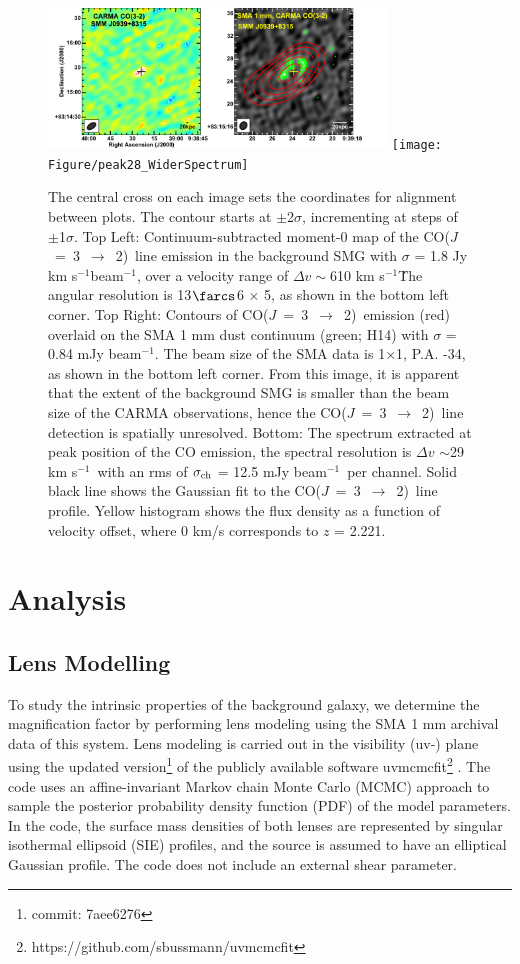 \documentclass[twocolumn,apj,numberedappendix]{emulateapj}
\newcommand{\CO}{\mbox{CO($J$ = 3 $\rightarrow$ 2) }}
\newcommand{\pmOne}{$^{-1}$}
\begin{document}
\begin{figure}[tbph] 
\centering
\includegraphics[width=0.8\textwidth]{Figure/LinePanel}
\texttt{[image: Figure/peak28\_WiderSpectrum]}
\caption{The central cross on each image sets the coordinates for alignment between plots. The contour starts at $\pm$2$\sigma$, 
incrementing at
steps of $\pm$1$\sigma$. Top Left: Continuum-subtracted moment-0 map of the \CO line emission in 
the background SMG with $\sigma$ = 1.8 Jy km s\pmOne beam\pmOne, over a velocity range of $\Delta v\sim$610 km s\pmOne\. The angular resolution is 13$\farcs$6 $\times$ 
5, as shown in the bottom left corner. 
Top Right: Contours of \CO emission (red) overlaid on the SMA 1 mm dust continuum (green; H14) with $
\sigma$ = 0.84 mJy beam\pmOne. The beam size of the SMA data is 1$ \times $1, P.A. -34\degr, as shown 
in the bottom left corner. From this image, it is apparent that the extent of the background SMG is smaller than the beam 
size of the CARMA observations, hence the \CO line detection is spatially unresolved. Bottom: 
The spectrum extracted at peak position of the CO emission, the spectral resolution is $\Delta v$ $\sim$29 km s\pmOne\ with an rms of $\sigma_{\rm ch}$ = 12.5 mJy beam\pmOne\ per channel.
Solid black line shows the Gaussian fit to the \CO line profile. Yellow histogram shows the 
flux density as a function of velocity offset, where 0 km/s corresponds to $z$ = 2.221. \label{fig:mom0}}
\end{figure}


\section{Analysis}
\subsection{Lens Modelling} \label{sec:Lens} 
To study the intrinsic properties of the background galaxy, we determine the magnification factor by performing
lens modeling using the SMA 1 mm archival data of this system. Lens modeling is carried out in the visibility
(uv-) plane using the updated version\footnote{commit: 7aee6276} of the publicly available software {\sc uvmcmcfit}\footnote{https://github.com/sbussmann/uvmcmcfit}
\citep{Bussmann15a}. The code uses an affine-invariant Markov chain Monte Carlo (MCMC) approach to sample the posterior
probability density function (PDF) of the model parameters. In the code, the surface mass densities of both
lenses are represented by singular isothermal ellipsoid (SIE) profiles, and the source is assumed to have an
elliptical Gaussian profile. The code does not include an external shear parameter.
\end{document}
